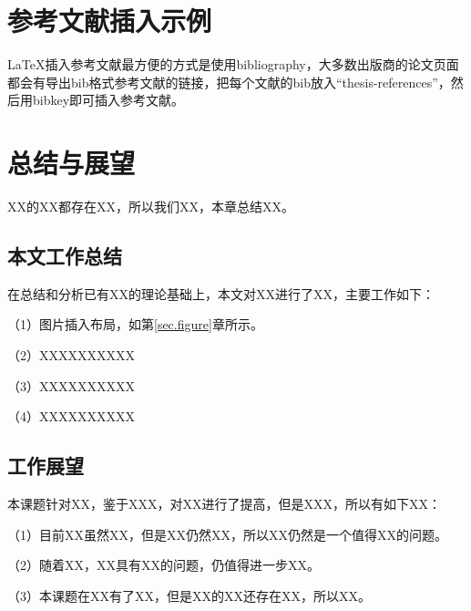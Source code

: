 \newpage

\section{参考文献插入示例}

LaTeX\cite{lamport1994latex}插入参考文献最方便的方式是使用bibliography\cite{pritchard1969statistical}，大多数出版商的论文页面都会有导出bib格式参考文献的链接，把每个文献的bib放入``thesis-references''，然后用bibkey即可插入参考文献。

\lipsum

\newpage


\section{总结与展望}

XX的XX都存在XX，所以我们XX，本章总结XX。

\subsection{本文工作总结}
在总结和分析已有XX的理论基础上，本文对XX进行了XX，主要工作如下：

（1）图片插入布局，如第\ref{sec.figure}章所示。

（2）XXXXXXXXXX

（3）XXXXXXXXXX

（4）XXXXXXXXXX

\subsection{工作展望}
本课题针对XX，鉴于XXX，对XX进行了提高，但是XXX，所以有如下XX：

（1）目前XX虽然XX，但是XX仍然XX，所以XX仍然是一个值得XX的问题。

（2）随着XX，XX具有XX的问题，仍值得进一步XX。

（3）本课题在XX有了XX，但是XX的XX还存在XX，所以XX。


\newpage
